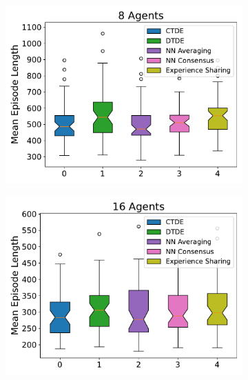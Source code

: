 \documentclass[sigconf]{acmart}
\begin{document}
\begin{figure}[htb]
  \centering
  \begin{subfigure}[b]{0.3\textwidth}
      \centering
      \includegraphics[width=\textwidth]{figures/mean-time-comparison-8-agents.pdf}
  \end{subfigure}
  \begin{subfigure}[b]{0.3\textwidth}
      \centering
      \includegraphics[width=\textwidth]{figures/mean-time-comparison-16-agents.pdf}
  \end{subfigure}
  \begin{subfigure}[b]{0.3\textwidth}

\end{subfigure}
\end{figure}
\end{document}
